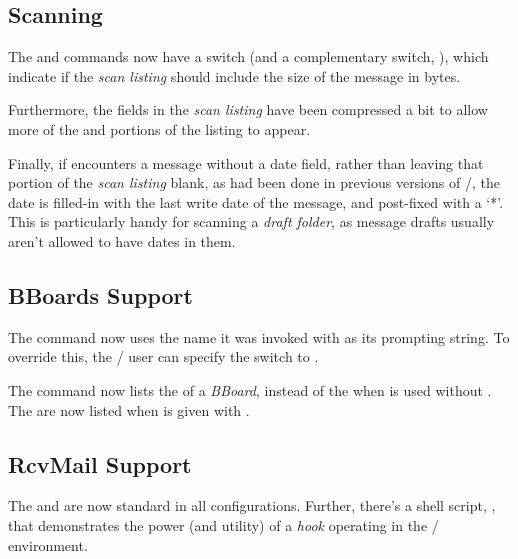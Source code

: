 \subsection{Scanning}
The  and  commands now have a  switch
(and a complementary switch, ),
which indicate if the {\it scan listing\/} should include the size of the
message in bytes.
\par
Furthermore,
the fields in the {\it scan listing\/} have been compressed a bit to allow
more of the  and  portions of the listing to appear.
\par
Finally,
if  encounters a message without a date field,
rather than leaving that portion of the {\it scan listing} blank,
as had been done in previous versions of \MH/,
the date is filled-in with the last write date of the message,
and post-fixed with a `*'.
This is particularly handy for scanning a {\it draft folder},
as message drafts usually aren't allowed to have dates in them.
\subsection{BBoards Support}
The  command now uses the name it was invoked with as its prompting
string.
To override this,
the \MH/ user can specify the  switch to .
\par
The  command now lists the  of a {\it BBoard},
instead of the  when  is used without
.
The  are now listed when  is given with
.
\subsection{RcvMail Support}
The  and  are now standard in all 
configurations.
Further, there's a shell script, ,
that demonstrates the power (and utility) of a {\it hook\/} operating in the
\MH/ environment.
